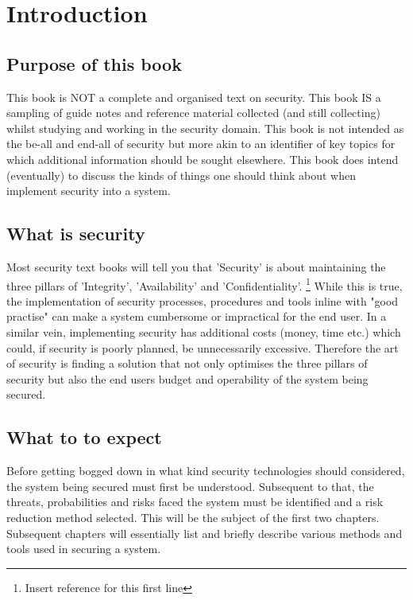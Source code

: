 \chapter{Introduction}
\section{Purpose of this book}
This book is NOT a complete and organised text on security. This book IS a sampling of guide notes and reference material collected (and still collecting) whilst studying and working in the security domain. This book is not intended as the be-all and end-all of security but more akin to an identifier of key topics for which additional information should be sought elsewhere. This book does intend (eventually) to discuss the kinds of things one should think about when implement security into a system.
\section{What is security}
Most security text books will tell you that 'Security' is about maintaining the three pillars of 'Integrity', 'Availability' and 'Confidentiality'. \footnote{Insert reference for this first line}
While this is true, the implementation of security processes, procedures and tools inline with "good practise" can make a system cumbersome or impractical for the end user. In a similar vein, implementing security has additional costs (money, time etc.) which could, if security is poorly planned, be unnecessarily excessive. Therefore the art of security is finding a solution that not only optimises the three pillars of security but also the end users budget and operability of the system being secured.
\section{What to to expect}
Before getting bogged down in what kind security technologies should considered, the system being secured must first be understood. Subsequent to that, the threats,  probabilities and risks faced the system must be identified and a risk reduction method selected. This will be the subject of the first two chapters. Subsequent chapters will essentially list and briefly describe various methods and tools used in securing a system.